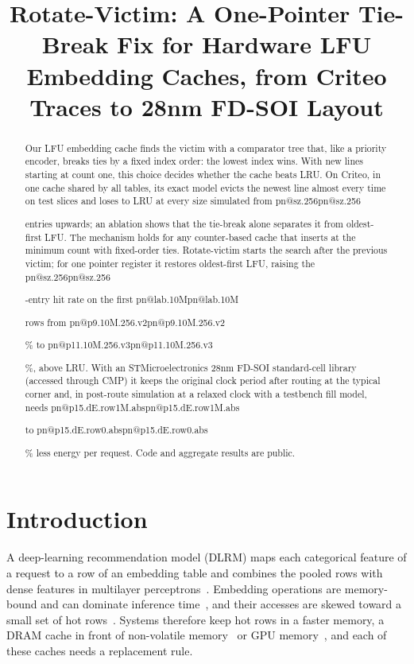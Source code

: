 \documentclass[conference,10pt]{IEEEtran}
\makeatletter
\newcommand{\R}[1]{\ifcsname pn@#1\endcsname\csname pn@#1\endcsname\else
  \PackageError{paper}{number key '#1' is not defined in macros.tex}{Run tools/make_paper_macros.py}\fi}
\makeatother
\begin{document}
\title{Rotate-Victim: A One-Pointer Tie-Break Fix for Hardware LFU Embedding Caches, from Criteo Traces to 28nm
FD-SOI Layout}

\author{
\and
{}
}

\maketitle

\begin{abstract}
Our LFU embedding cache finds the victim with a comparator tree that, like a priority
encoder, breaks ties by a fixed index order: the lowest index wins. With new lines starting at count one, this choice
decides whether the cache beats LRU. On Criteo, in one cache shared by all tables, its exact model
evicts the newest line almost every time on test slices and loses to LRU at every size simulated from \R{sz.256}
entries upwards; an ablation shows that the tie-break alone separates it from oldest-first LFU. The mechanism holds
for any counter-based cache that inserts at the minimum count with fixed-order ties. Rotate-victim starts the search
after the previous victim; for one pointer register it restores oldest-first LFU, raising the \R{sz.256}-entry hit
rate on the first \R{lab.10M} rows from \R{p9.10M.256.v2}\% to \R{p11.10M.256.v3}\%,
above LRU. With an STMicroelectronics 28nm FD-SOI standard-cell library (accessed through CMP) it keeps the original
clock period after routing at the typical corner and, in post-route simulation at a relaxed clock with a testbench
fill model, needs \R{p15.dE.row1M.abs} to \R{p15.dE.row0.abs}\% less energy per request. Code and aggregate
results are public.
\end{abstract}

\section{Introduction}\label{sec:intro}
A deep-learning recommendation model (DLRM) maps each categorical feature of a request to a row of an embedding
table and combines the pooled rows with dense features in multilayer perceptrons~\cite{naumov2019dlrm}. Embedding
operations are memory-bound and can dominate inference time~\cite{gupta2020architectural,ke2020recnmp}, and their
accesses are skewed toward a small set of hot rows~\cite{adnan2022fae,agarwal2023bagpipe}. Systems therefore keep
hot rows in a faster memory, a DRAM cache in front of non-volatile memory~\cite{eisenman2019bandana} or GPU
memory~\cite{adnan2022fae,xie2022fleche,wei2022hps}, and each of these caches needs a replacement rule.
\end{document}
